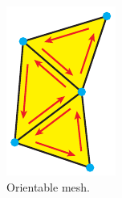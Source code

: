 \begin{description}
	\begin{figure}[h]
		\centering
		\begin{subfigure}[b]{0.3\textwidth}
			\includegraphics[width=\textwidth]{images/orientable}
			\caption{Orientable mesh.}
			\label{fig:orientable}
		\end{subfigure}
		\begin{subfigure}[b]{0.3\textwidth}

\end{subfigure}
\end{figure}
\end{description}
